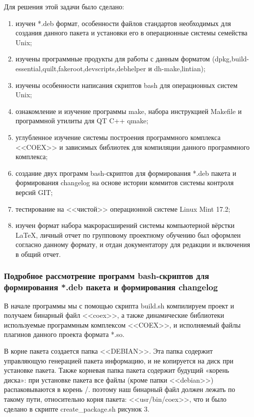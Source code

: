 Для решения этой задачи было сделано:

\begin{enumerate}
\item изучен *.deb формат, особенности файлов стандартов необходимых для создания данного пакета и установки его в операционные системы семейства Unix; 
\item изучены программные продукты для работы с данным форматом (dpkg,build-essential,quilt,fakeroot,devscripts,debhelper и dh-make,lintian);
\item изучены особенности написания скриптов bash для операционных систем Unix;
\item ознакомление и изучение программы make, набора инструкцией Makefile и программной утилиты для QT C++ qmake;
\item углубленное изучение системы построения программного комплекса <<COEX>> и зависимых библиотек для компиляции данного программного комплекса;
\item создание двух программ bash-скриптов для формирования *.deb пакета и формирования changelog на основе истории коммитов системы контроля версий GIT;
\item тестирование на <<чистой>> операционной системе Linux Mint 17.2;
\item изучен формат набора макрорасширений системы компьютерной вёрстки LaTeX, личный отчет по групповому проектному обучению был оформлен согласно данному формату, и отдан документатору для редакции и включения в общий отчет.
\end{enumerate}

\subsubsection{ Подробное рассмотрение программ bash-скриптов для формирования *.deb пакета и формирования changelog}

В начале программы мы с помощью скрипта build.sh компилируем проект и получаем бинарный файл <<coex>>, а также динамические библиотеки используемые программным комплексом <<COEX>>, и исполняемый файлы плагинов данного проекта формата *.so. 

В корне пакета создается папка <<DEBIAN>>. Эта папка содержит управляющую генерацией пакета информацию, и не копируется на диск при установке пакета.
Также корневая папка пакета содержит будущий «корень диска»: при установке пакета все файлы (кроме папки <<debian>>) распаковываются в корень /. поэтому наш бинарный файл должен лежать по такому пути, относительно корня пакета: <<usr/bin/coex>>, что и было сделано в скрипте create\_package.sh рисунок 3. 

